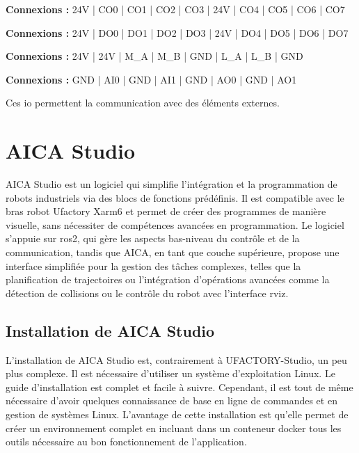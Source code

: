 \begin{tcolorbox}[colframe=black, colback=ConfigOutputColor, title=Configurable Outputs]
    \textbf{Connexions :} 24V | CO0 | CO1 | CO2 | CO3 | 24V | CO4 | CO5 | CO6 | CO7
\end{tcolorbox}

\begin{tcolorbox}[colframe=black, colback=DigitalOutputColor, title=Digital Outputs]
    \textbf{Connexions :} 24V | DO0 | DO1 | DO2 | DO3 | 24V | DO4 | DO5 | DO6 | DO7
\end{tcolorbox}

\begin{tcolorbox}[colframe=black, colback=RS485Color, title=RS485]
    \textbf{Connexions :} 24V | 24V | M\_A | M\_B | GND | L\_A | L\_B | GND
\end{tcolorbox}

\begin{tcolorbox}[colframe=black, colback=AnalogColor, title=Analog]
    \textbf{Connexions :} GND | AI0 | GND | AI1 | GND | AO0 | GND | AO1
\end{tcolorbox}

Ces \gls{io} permettent la communication avec des éléments externes.

\section{AICA Studio}
AICA Studio est un logiciel qui simplifie l'intégration et la programmation de robots industriels via des blocs de fonctions prédéfinis. Il est compatible avec le bras robot Ufactory Xarm6 et permet de créer des programmes de manière visuelle, sans nécessiter de compétences avancées en programmation. Le logiciel s'appuie sur \gls{ros2}, qui gère les aspects bas-niveau du contrôle et de la communication, tandis que AICA, en tant que couche supérieure, propose une interface simplifiée pour la gestion des tâches complexes, telles que la planification de trajectoires ou l'intégration d'opérations avancées comme la détection de collisions ou le contrôle du robot avec l'interface \gls{rviz}.

\subsection{Installation de AICA Studio}
L'installation de AICA Studio est, contrairement à UFACTORY-Studio, un peu plus complexe. Il est nécessaire d'utiliser un système d'exploitation Linux. Le guide d'installation \cite{AICADocs} est complet et facile à suivre. Cependant, il est tout de même nécessaire d'avoir quelques connaissance de base en ligne de commandes et en gestion de systèmes Linux. L'avantage de cette installation est qu'elle permet de créer un environnement complet en incluant dans un \gls{conteneur} \gls{docker} tous les outils nécessaire au bon fonctionnement de l'application.

